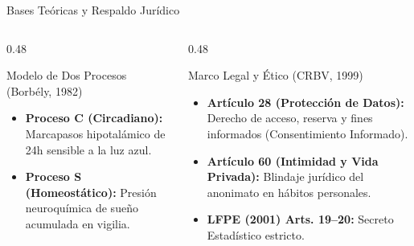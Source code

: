 \documentclass[10pt, aspectratio=169]{beamer}
\begin{document}
\begin{frame}{Bases Teóricas y Respaldo Jurídico}
    \begin{columns}[T]
        \begin{column}{0.48\textwidth}
            \begin{block}{Modelo de Dos Procesos (Borbély, 1982)}
                \begin{itemize}
                    \item \textbf{Proceso C (Circadiano):} Marcapasos hipotalámico de 24h sensible a la luz azul.
                    \item \textbf{Proceso S (Homeostático):} Presión neuroquímica de sueño acumulada en vigilia.
                \end{itemize}
            \end{block}
        \end{column}
        \begin{column}{0.48\textwidth}
            \begin{block}{Marco Legal y Ético (CRBV, 1999)}
                \begin{itemize}
                    \item \textbf{Artículo 28 (Protección de Datos):} Derecho de acceso, reserva y fines informados (Consentimiento Informado).
                    \item \textbf{Artículo 60 (Intimidad y Vida Privada):} Blindaje jurídico del anonimato en hábitos personales.
                    \item \textbf{LFPE (2001) Arts. 19--20:} Secreto Estadístico estricto.
                \end{itemize}
            \end{block}
        \end{column}
    \end{columns}
\end{frame}
\end{document}
